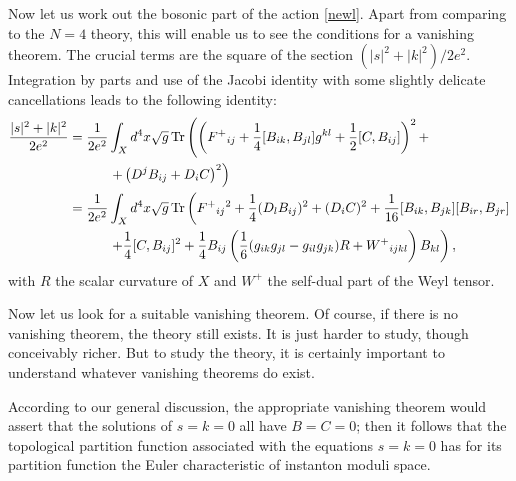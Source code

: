 \documentclass[12pt]{article}
\numberwithin{equation}{section}
\DeclareMathOperator{\Tr}{Tr}
\begin{document}
Now let us work out the bosonic part of the action \eqref{newl}.
Apart from comparing to the $N=4$ theory, this will enable us to see
the conditions for a vanishing theorem.  The crucial terms
are the square of the section $(|s|^2+|k|^2)/2e^2$.
Integration by parts and use of the Jacobi identity with some slightly
delicate cancellations
leads to the following identity:
\begin{equation}
  \label{usefulid}
  \begin{aligned} {|s|^2+|k|^2\over 2e^2}&={1\over
    2e^2}\int_Xd^4x\sqrt g \Tr\left(\left(F^+{}_{ij} +{1\over
        4}[B_{ik},B_{jl}]g^{kl}+{1\over
      2}[C,B_{ij}]\right)^2+\right.\\ &~~~~~~~~~\left.
    +\left(D^jB_{ij}+D_iC\right)^2\right) \\ & = {1\over
    2e^2}\int_Xd^4x\sqrt g \Tr\left(F^+{}_{ij}{}^2+{1\over
      4}(D_lB_{ij})^2+(D_iC)^2 +{1\over
      16}[B_{ik},B_{jk}][B_{ir},B_{jr}]\right. \\ &~~~~~~~~~\left.  +
      {1\over 4}[C,B_{ij}]^2 +{1\over 4}B_{ij}\left({1\over
    6}(g_{ik}g_{jl}-g_{il}g_{jk})R+W^+{}_{ijkl} \right)B_{kl}\right), \\
  \end{aligned}
\end{equation}
with $R$ the scalar curvature of $X$ and $W^+$ the self-dual part of the
Weyl tensor.

\bigskip
{}

Now let us look for a suitable vanishing theorem.
Of course, if there is no vanishing theorem, the theory still
exists.  It is just harder to study, though conceivably richer.
But to study the theory, it is certainly important to understand
whatever vanishing theorems do exist.

According to our general discussion,
the appropriate vanishing theorem would assert
that the solutions
of $s=k=0$ all have $B=C=0$; then it follows that the topological
partition function associated with the equations $s=k=0$ has for
its partition function the Euler characteristic of instanton moduli space.
\end{document}
